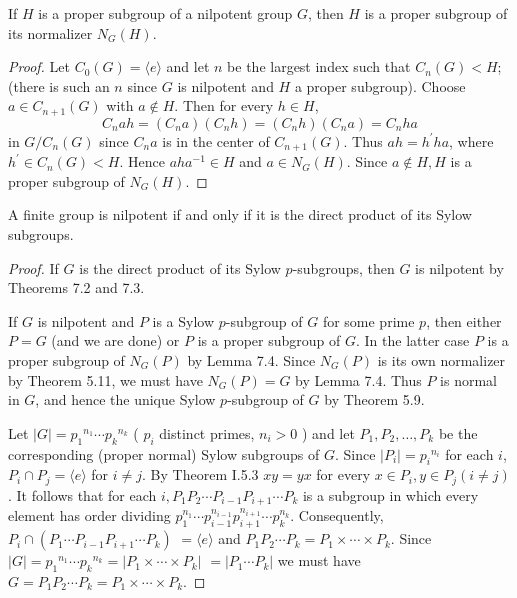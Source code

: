 \begin{proposition}
    If $H$ is a proper subgroup of a nilpotent group $G$, then $H$ is a proper subgroup of its normalizer $N_{G}(H)$.
    \begin{proof}
        Let $C_0(G)=\langle e\rangle$ and let $n$ be the largest index such that $C_n(G)<H$; (there is such an $n$ since $G$ is nilpotent and $H$ a proper subgroup).
        Choose $a \in C_{n+1}(G)$ with $a \notin H$. Then for every $h \in H$,
        \begin{equation*}
            C_n a h
            =
            \left(C_n a\right)\left(C_n h\right)
            =
            \left(C_n h\right)\left(C_n a\right)=C_n h a
        \end{equation*}
        in $G / C_n(G)$ since $C_n a$ is in the center of $C_{n+1}(G)$.
        Thus $a h=h^{\prime} h a$, where $h^{\prime} \in C_n(G)<H$. Hence $a h a^{-1} \in H$ and $a \in N_G(H)$. Since $a \notin H, H$ is a proper subgroup of $N_G(H)$.
    \end{proof}
\end{proposition}

\begin{theorem}
    A finite group is nilpotent if and only if it is the direct product of its Sylow subgroups.
    \begin{proof}
        If $G$ is the direct product of its Sylow $p$-subgroups, then $G$ is nilpotent by Theorems 7.2 and 7.3.

        If $G$ is nilpotent and $P$ is a Sylow $p$-subgroup of $G$ for some prime $p$, then either $P=G$ (and we are done) or $P$ is a proper subgroup of $G$. In the latter case $P$ is a proper subgroup of $N_G(P)$ by Lemma 7.4. Since $N_G(P)$ is its own normalizer by Theorem 5.11, we must have $N_G(P)=G$ by Lemma 7.4. Thus $P$ is normal in $G$, and hence the unique Sylow $p$-subgroup of $G$ by Theorem 5.9.

        Let
        $|G|=p_1{ }^{n_1} \cdots p_k{ }^{n_k}$ ( $p_i$ distinct primes, $n_i>0$ ) and let $P_1, P_2, \ldots, P_k$ be the corresponding (proper normal) Sylow subgroups of $G$. Since $\left|P_i\right|=p_i{ }^{n_i}$ for each $i$, $P_i \cap P_j=\langle e\rangle$ for $i \neq j$. By Theorem I.5.3 $x y=y x$ for every $x \in P_i, y \in P_j(i \neq j)$. It follows that for each $i, P_1 P_2 \cdots P_{i-1} P_{i+1} \cdots P_k$ is a subgroup in which every element has order dividing $p_1^{n_1} \cdots p_{i-1}^{n_{i-1}} p_{i+1}^{n_{i+1}} \cdots p_k^{n_k}$. Consequently, $P_i \cap\left(P_1 \cdots P_{i-1} P_{i+1} \cdots P_k\right)$ $=\langle e\rangle$ and $P_1 P_2 \cdots P_k=P_1 \times \cdots \times P_k$. Since $|G|=p_1{ }^{n_1} \cdots p_k{ }^{n_k}=\left|P_1 \times \cdots \times P_k\right|$ $=\left|P_1 \cdots P_k\right|$ we must have $G=P_1 P_2 \cdots P_k=P_1 \times \cdots \times P_k$.
    \end{proof}
\end{theorem}


